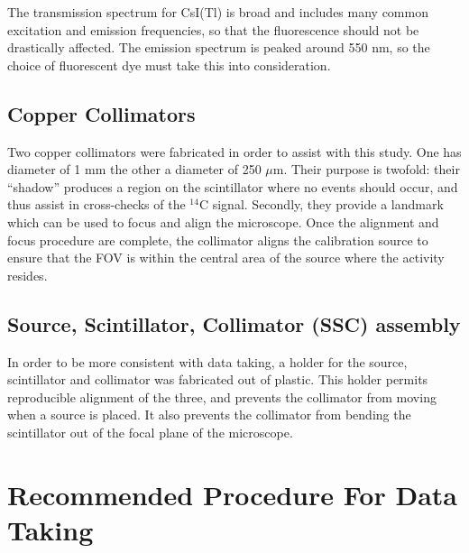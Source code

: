 \documentclass[11pt]{article}
\newcommand{\nuc}[2]{\ensuremath{^{#1}}#2}
\begin{document}
The transmission spectrum for CsI(Tl) is broad and includes many common excitation and emission frequencies, so that the fluorescence should not be drastically affected.  The emission spectrum is peaked around 550 nm, so the choice of fluorescent dye must take this into consideration.  




\subsection{Copper Collimators}
Two copper collimators were fabricated in order to assist with this study. 
One has diameter of 1 mm the other a diameter of 250 $\mu$m.
Their purpose is twofold: their ``shadow'' produces a region on the scintillator where no events should occur, and thus assist in cross-checks of the \nuc{14}{C} signal. Secondly, they provide a landmark which can be used to focus and align the microscope. Once the alignment and focus procedure are complete, the collimator aligns the calibration source to ensure that the FOV is within the central area of the source where the activity resides. 



\subsection{Source, Scintillator, Collimator (SSC) assembly}
In order to be more consistent with data taking, a holder for the source, scintillator and collimator was fabricated out of plastic. 
This holder permits reproducible alignment of the three, and prevents the collimator from moving when a source is placed.
It also prevents the collimator from bending the scintillator out of the focal plane of the microscope.   




\section{Recommended Procedure For Data Taking} %
\end{document}
